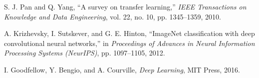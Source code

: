 \begin{thebibliography}{99}

 S. J. Pan and Q. Yang, ``A survey on transfer learning,'' \textit{IEEE Transactions on Knowledge and Data Engineering}, vol. 22, no. 10, pp. 1345–1359, 2010.

 A. Krizhevsky, I. Sutskever, and G. E. Hinton, ``ImageNet classification with deep convolutional neural networks,'' in \textit{Proceedings of Advances in Neural Information Processing Systems (NeurIPS)}, pp. 1097–1105, 2012.

 I. Goodfellow, Y. Bengio, and A. Courville, \textit{Deep Learning}, MIT Press, 2016.

\end{thebibliography}

